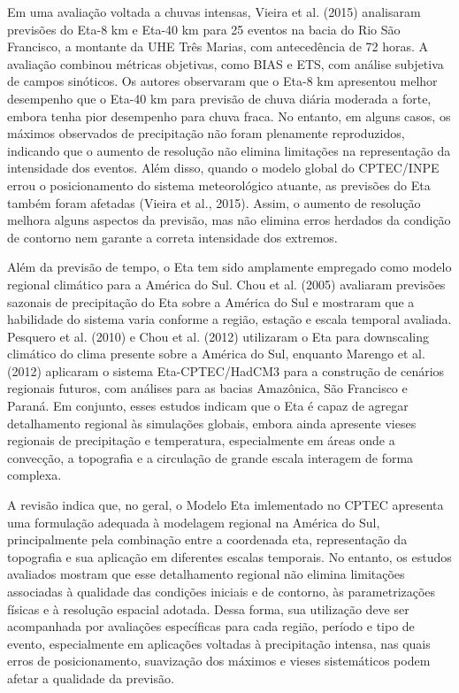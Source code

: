 \documentclass[12pt,a4paper,oneside]{book}
\begin{document}
Em uma avaliação voltada a chuvas intensas, Vieira et al. (2015) analisaram previsões do Eta-8 km e Eta-40 km para 25 eventos na bacia do Rio São Francisco, a montante da UHE Três Marias, com antecedência de 72 horas. A avaliação combinou métricas objetivas, como BIAS e ETS, com análise subjetiva de campos sinóticos. Os autores observaram que o Eta-8 km apresentou melhor desempenho que o Eta-40 km para previsão de chuva diária moderada a forte, embora tenha pior desempenho para chuva fraca. No entanto, em alguns casos, os máximos observados de precipitação não foram plenamente reproduzidos, indicando que o aumento de resolução não elimina limitações na representação da intensidade dos eventos. Além disso, quando o modelo global do CPTEC/INPE errou o posicionamento do sistema meteorológico atuante, as previsões do Eta também foram afetadas (Vieira et al., 2015). Assim, o aumento de resolução melhora alguns aspectos da previsão, mas não elimina erros herdados da condição de contorno nem garante a correta intensidade dos extremos.

Além da previsão de tempo, o Eta tem sido amplamente empregado como modelo regional climático para a América do Sul. Chou et al. (2005) avaliaram previsões sazonais de precipitação do Eta sobre a América do Sul e mostraram que a habilidade do sistema varia conforme a região, estação e escala temporal avaliada. Pesquero et al. (2010) e Chou et al. (2012) utilizaram o Eta para downscaling climático do clima presente sobre a América do Sul, enquanto Marengo et al. (2012) aplicaram o sistema Eta-CPTEC/HadCM3 para a construção de cenários regionais futuros, com análises para as bacias Amazônica, São Francisco e Paraná. Em conjunto, esses estudos indicam que o Eta é capaz de agregar detalhamento regional às simulações globais, embora ainda apresente vieses regionais de precipitação e temperatura, especialmente em áreas onde a convecção, a topografia e a circulação de grande escala interagem de forma complexa.

A revisão indica que, no geral, o Modelo Eta imlementado no CPTEC apresenta uma formulação adequada à modelagem regional na América do Sul, principalmente pela combinação entre a coordenada eta, representação da topografia e sua aplicação em diferentes escalas temporais. No entanto, os estudos avaliados mostram que esse detalhamento regional não elimina limitações associadas à qualidade das condições iniciais e de contorno, às parametrizações físicas e à resolução espacial adotada. Dessa forma, sua utilização deve ser acompanhada por avaliações específicas para cada região, período e tipo de evento, especialmente em aplicações voltadas à precipitação intensa, nas quais erros de posicionamento, suavização dos máximos e vieses sistemáticos podem afetar a qualidade da previsão.
\end{document}
